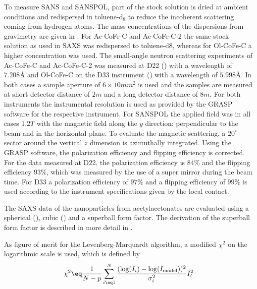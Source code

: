 \documentclass[\main/dresen_thesis.tex]{subfiles}
\begin{document}
    To measure SANS and SANSPOL, part of the stock solution is dried at ambient conditions and redispersed in toluene-$\mathrm{d_8}$ to reduce the incoherent scattering coming from hydrogen atoms.
    The mass concentrations of the dispersions from gravimetry are given in .
    For Ac-CoFe-C and Ac-CoFe-C-2 the same stock solution as used in SAXS was redispersed to toluene-d8, whereas for Ol-CoFe-C a higher concentration was used.
    The small-angle neutron scattering experiments of Ac-CoFe-C and Ac-CoFe-C-2 was measured at D22 () with a wavelength of $7.208 \unit{\angstrom}$ and Ol-CoFe-C on the D33 instrument () with a wavelength of $5.998 \unit{\angstrom}$.
    In both cases a sample aperture of $6 \times 10 \unit{mm^2}$ is used and the samples are measured at short detector distance of $2 \unit{m}$ and a long detector distance of $8 \unit{m}$.
    For both instruments the instrumental resolution is used as provided by the GRASP software for the respective instrument.
    For SANSPOL the applied field was in all cases $1.2 \unit{T}$ with the magnetic field along the $y$ direction: perpendicular to the beam and in the horizontal plane.
    To evaluate the magnetic scattering, a $20^\circ$ sector around the vertical $z$ dimension is azimuthally integrated.
    Using the GRASP software, the polarization efficiency and flipping efficiency is corrected.
    For the data measured at D22, the polarization efficiency is $84 \%$ and the flipping efficiency $93 \%$, which was measured by the use of a super mirror during the beam time.
    For D33 a polarization efficiency of $97 \%$ and a flipping efficiency of $99 \%$ is used according to the instrument specifications given by the local contact.

    The SAXS data of the nanoparticles from acetylacetonates are evaluated using a spherical (), cubic () and a superball form factor.
    The derivation of the superball form factor is described in more detail in .

    As figure of merit for the Levenberg-Marquardt algorithm\cite{Marquardt_1963_Analgo, Oliphant_2006_Guide}, a modified $\chi^2$ on the logarithmic scale is used, which is defined by
    \begin{align}
      \chi^2 \eq \frac{1}{N-p} \sum_{i\eq 1}^{N} \frac{(\log(I_i) - \log(I_\mathrm{model}))^2}{\sigma_i^2} I^2_i
    \end{align}
\end{document}
